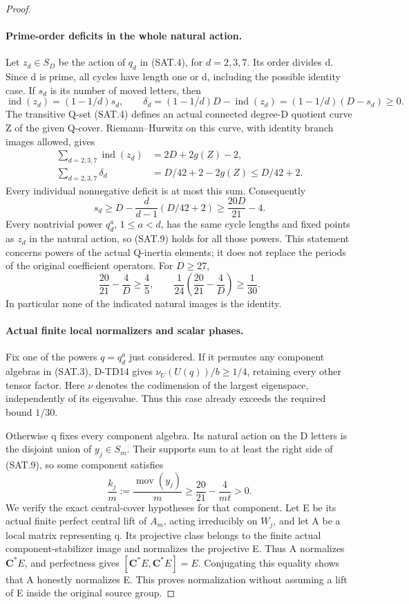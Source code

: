 \begin{proof}
\paragraph{Prime-order deficits in the whole natural action.}
Let \(z_d\in S_D\) be the action of \(q_d\) in (SAT.4),
for \(d=2,3,7\). Its order divides d. Since d is prime, all
cycles have length one or d, including the possible identity case.
If \(s_d\) is its number of moved letters, then
\[
 \operatorname{ind}(z_d)=(1-1/d)s_d,\qquad
 \delta_d=(1-1/d)D-\operatorname{ind}(z_d)
           =(1-1/d)(D-s_d)\ge0.
 \tag{SAT.7}
\]
The transitive Q-set (SAT.4) defines an actual connected degree-D
quotient curve Z of the given Q-cover. Riemann--Hurwitz on this
curve, with identity branch images allowed, gives
\[
 \begin{split}
 \sum_{d=2,3,7}\operatorname{ind}(z_d)&=2D+2g(Z)-2,\\
 \sum_{d=2,3,7}\delta_d&=D/42+2-2g(Z)\le D/42+2.
 \end{split}
 \tag{SAT.8}
\]
Every individual nonnegative deficit is at most this sum.
Consequently
\[
 s_d\ge D-\frac{d}{d-1}(D/42+2)
       \ge\frac{20D}{21}-4.
 \tag{SAT.9}
\]
Every nontrivial power \(q_d^a\), \(1\le a<d\), has the same
cycle lengths and fixed points as \(z_d\) in the natural action,
so (SAT.9) holds for
all those powers. This statement concerns powers of the actual
Q-inertia elements; it does not replace the periods of the
original coefficient operators. For \(D\ge27\),
\[
             \frac{20}{21}-\frac4D\ge\frac45,
       \qquad\frac1{24}\left(\frac{20}{21}-\frac4D\right)
                      \ge\frac1{30}.
 \tag{SAT.10}
\]
In particular none of the indicated natural images is the identity.

\paragraph{Actual finite local normalizers and scalar phases.}
Fix one of the powers \(q=q_d^a\) just considered. If it permutes
any component algebras in (SAT.3), D-TD14 gives
\(\nu_U(U(q))/b\ge1/4\), retaining every other tensor factor.
Here \(\nu\) denotes the codimension of the largest eigenspace,
independently of its eigenvalue. Thus this case already exceeds
the required bound \(1/30\).

Otherwise q fixes every component algebra. Its natural action on
the D letters is the disjoint union of \(y_j\in S_m\).
Their supports sum to at least the right side of (SAT.9), so some
component satisfies
\[
 \frac{k_j}{m}:=\frac{\operatorname{mov}(y_j)}m
                 \ge\frac{20}{21}-\frac4{mt}>0.
 \tag{SAT.11}
\]
We verify the exact central-cover hypotheses for that component.
Let E be its actual finite perfect central lift of \(A_m\),
acting irreducibly on \(W_j\), and let A be a local matrix
representing q. Its projective class belongs to the finite actual
component-stabilizer image and normalizes the projective E.
Thus A normalizes \(\mathbf C^*E\), and perfectness gives
\([\mathbf C^*E,\mathbf C^*E]=E\). Conjugating this equality
shows that A honestly normalizes E. This proves normalization
without assuming a lift of E inside the original source group.


\end{proof}
